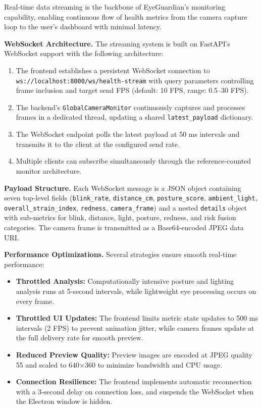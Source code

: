 \documentclass[12pt]{report}
\begin{document}
Real‑time data streaming is the backbone of EyeGuardian's monitoring capability, enabling continuous flow of health metrics from the camera capture loop to the user's dashboard with minimal latency.

\textbf{WebSocket Architecture.} The streaming system is built on FastAPI's WebSocket support with the following architecture:

\begin{enumerate}
    \item The frontend establishes a persistent WebSocket connection to \texttt{ws://localhost:8000/ws/health-stream} with query parameters controlling frame inclusion and target send FPS (default: 10 FPS, range: 0.5–30 FPS).
    \item The backend's \texttt{GlobalCameraMonitor} continuously captures and processes frames in a dedicated thread, updating a shared \texttt{latest\_payload} dictionary.
    \item The WebSocket endpoint polls the latest payload at 50 ms intervals and transmits it to the client at the configured send rate.
    \item Multiple clients can subscribe simultaneously through the reference‑counted monitor architecture.
\end{enumerate}

\textbf{Payload Structure.} Each WebSocket message is a JSON object containing seven top‑level fields (\texttt{blink\_rate}, \texttt{distance\_cm}, \texttt{posture\_score}, \texttt{ambient\_light}, \texttt{overall\_strain\_index}, \texttt{redness}, \texttt{camera\_frame}) and a nested \texttt{details} object with sub‑metrics for blink, distance, light, posture, redness, and risk fusion categories. The camera frame is transmitted as a Base64‑encoded JPEG data URI.

\textbf{Performance Optimizations.} Several strategies ensure smooth real‑time performance:

\begin{itemize}
    \item \textbf{Throttled Analysis:} Computationally intensive posture and lighting analysis runs at 5‑second intervals, while lightweight eye processing occurs on every frame.
    \item \textbf{Throttled UI Updates:} The frontend limits metric state updates to 500 ms intervals (2 FPS) to prevent animation jitter, while camera frames update at the full delivery rate for smooth preview.
    \item \textbf{Reduced Preview Quality:} Preview images are encoded at JPEG quality 55 and scaled to 640×360 to minimize bandwidth and CPU usage.
    \item \textbf{Connection Resilience:} The frontend implements automatic reconnection with a 3‑second delay on connection loss, and suspends the WebSocket when the Electron window is hidden.
\end{itemize}
\end{document}
